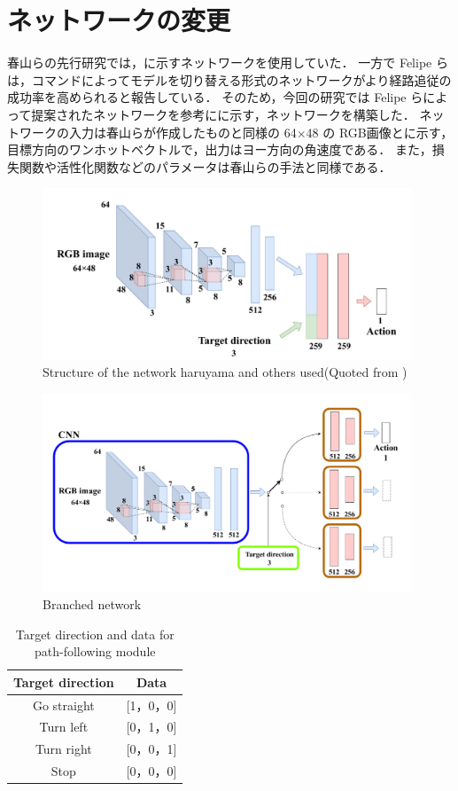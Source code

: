 \section{ネットワークの変更}
春山らの先行研究では，に示すネットワークを使用していた．
一方で Felipe らは，コマンドによってモデルを切り替える形式のネットワークがより経路追従の成功率を高められると報告している．
そのため，今回の研究では Felipe らによって提案されたネットワークを参考にに示す，ネットワークを構築した．
ネットワークの入力は春山らが作成したものと同様の 64×48 の RGB画像とに示す，目標方向のワンホットベクトルで，出力はヨー方向の角速度である．
また，損失関数や活性化関数などのパラメータは春山らの手法と同様である．

\begin{figure}[htbp]
  \centering
  \includegraphics[width=110mm]{images/pdf/haruyama/net.pdf}
  \caption[Structure of the network haruyama and others used]{Structure of the network haruyama and others used(Quoted from \cite{fujiwara2023})}
  \label{fig:haruyama_net}
\end{figure}

\begin{figure}[htbp]
  \centering
   \includegraphics[width=110mm]{images/pdf/ishiguro/branched.pdf}
   \caption{Branched network}
   \label{fig:branched}
\end{figure}

\begin{table}[htbp]
  \centering
  \caption{Target direction and data for path-following module}\label{tab:cmd_dir}
  \begin{tabular}{|c|c|}
  \hline
  Target direction & Data        \\
  \hline
  Go straight   & {[}1，0，0{]} \\
  Turn left   & {[}0，1，0{]} \\
  Turn right   & {[}0，0，1{]} \\
  Stop   & {[}0，0，0{]}\\
  \hline
  \end{tabular}
\end{table}

\clearpage